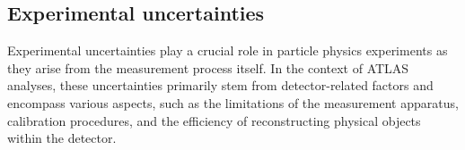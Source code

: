 


\subsection{Experimental uncertainties}
\label{sec:ChaptH:Systematics:Exp}

Experimental uncertainties play a crucial role in particle physics experiments as they arise from the 
measurement process itself. In the context of ATLAS analyses, these uncertainties primarily stem from 
detector-related factors and encompass various aspects, such as the limitations of the measurement 
apparatus, calibration procedures, and the efficiency of reconstructing physical objects within the 
detector.
 
